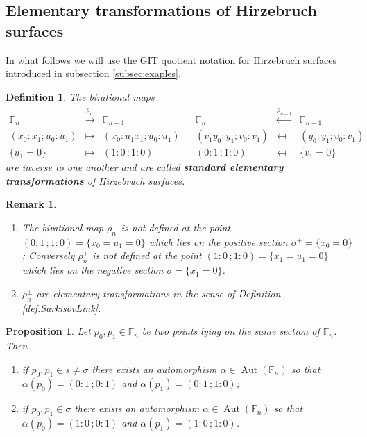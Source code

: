 \documentclass[a4paper,11pt]{amsart}
\newtheorem{proposition}[theorem]{Proposition}
\newtheorem{remark}[theorem]{Remark}
\newtheorem{definition}[theorem]{Definition}
\def\Aut{\operatorname{Aut}}
\renewcommand{\FF}{\mathbb{F}}
\begin{document}
\subsection{Elementary transformations of Hirzebruch surfaces}

In what follows we will use the \hyperlink{hirzGIT}{GIT quotient} notation for Hirzebruch surfaces introduced in subsection \ref{subsec:exaples}.



\begin{definition}
	The birational maps
	\[
	\begin{array}{ccccccc}
		\FF_n & \overset{\rho_{n}^{-}}{\longrightarrow} & \FF_{n-1}&&  \FF_n & \overset{\rho_{n-1}^{+}}{\longleftarrow} & \FF_{n-1}\\
		(x_0:x_1;u_0:u_1) & \mapsto & (x_0:u_1x_1;u_0:u_1)&&(v_1y_0:y_1;v_0:v_1)&\mapsfrom & (y_0:y_1;v_0:v_1)\\
		\{u_1 = 0\} & \mapsto & (1:0\,;1:0)&&(0:1\,;1:0) & \mapsfrom & \{v_1 = 0\}
	\end{array}
	\]
	are inverse to one another and are called \textbf{standard elementary transformations} of Hirzebruch surfaces.
\end{definition}

\begin{remark}\leavevmode
	\begin{enumerate}
		\item The birational map $\rho_n^{-}$ is not defined at the point $(0:1\,; 1:0) = \{x_0 = u_1 = 0\}$ which lies on the positive section $\sigma^+ = \{x_0=0\}$;
		Conversely $\rho_n^{+}$ is not defined at the point $(1:0\,; 1:0) = \{x_1 = u_1 = 0\}$ which lies on the negative section $\sigma = \{x_1=0\}$.
		\item $\rho_n^{\pm}$ are elementary transformations in the sense of Definition \ref{def:SarkisovLink}.
	\end{enumerate}
\end{remark}

\begin{proposition}\label{prop:autFn}
	Let $p_0, p_1 \in \FF_n$ be two points lying on the same section of $\FF_n$.
	Then 
	\begin{enumerate}		
		\item\label{lemit:autFn1} if $p_0, p_1 \in s \neq \sigma$ there exists an automorphism $\alpha \in \Aut(\FF_n)$ so that $\alpha(p_0) = (0:1\,; 0:1)$ and $\alpha(p_1) = (0:1\,; 1:0)$;
		\item\label{lemit:autFn2} if $p_0, p_1 \in \sigma$ there exists an automorphism $\alpha \in \Aut(\FF_n)$ so that $\alpha(p_0) = (1:0\,; 0:1)$ and $\alpha(p_1) = (1:0\,; 1:0)$.
	\end{enumerate}
\end{proposition}
\end{document}
